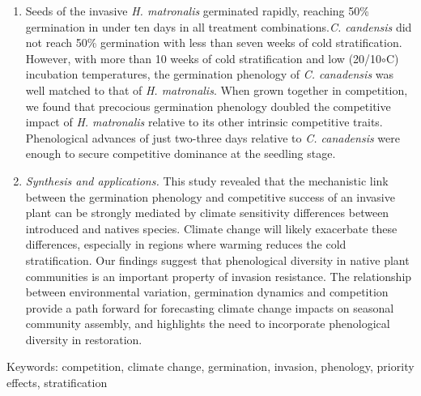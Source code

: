 \documentclass{article}[11pt]
\begin{document}
\begin{enumerate}
\item Seeds of the invasive \textit{H. matronalis} germinated rapidly, reaching 50\% germination in under ten days in all treatment combinations.\textit{C. candensis} did not reach 50\% germination with less than seven weeks of cold stratification. However, with more than 10 weeks of cold stratification and low (20/10$\circ$C) incubation temperatures, the germination phenology of \textit{C. canadensis} was well matched to that of \textit{H. matronalis}. When grown together in competition, we found that precocious germination phenology doubled the competitive impact of \textit{H. matronalis} relative to its other intrinsic competitive traits. Phenological advances of just two-three days relative to \textit{C. canadensis} were enough to secure competitive dominance at the seedling stage. %
\item \textit{Synthesis and applications.} This study revealed that the mechanistic link between the germination phenology and competitive success of an invasive plant can be strongly mediated by climate sensitivity differences between introduced and natives species. Climate change will likely exacerbate these differences, especially in regions where warming reduces the cold stratification. Our findings suggest that phenological diversity in native plant communities is an important property of invasion resistance. The relationship between environmental variation, germination dynamics and competition provide a path forward for forecasting climate change impacts on seasonal community assembly, and highlights the need to incorporate phenological diversity in restoration.

\end{enumerate}

Keywords: competition, climate change, germination, invasion, phenology, priority effects, stratification

\pagebreak
\end{document}
